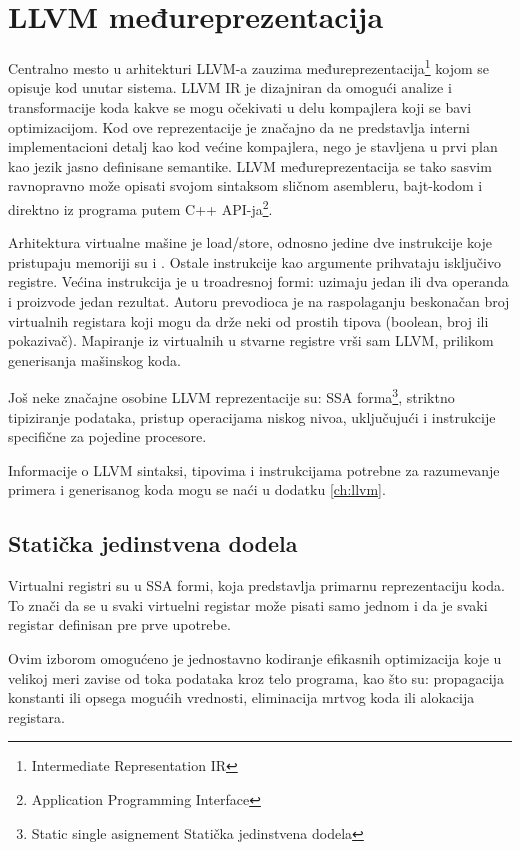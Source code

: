 \section{LLVM međureprezentacija}

Centralno mesto u arhitekturi LLVM-a\cite{aosa} zauzima međureprezentacija\footnote{\eng Intermediate Representation \ndash IR} 
kojom se opisuje kod unutar sistema. 
LLVM IR je dizajniran da omogući analize i transformacije koda kakve se mogu očekivati u delu kompajlera koji se bavi optimizacijom. 
Kod ove reprezentacije je značajno da ne predstavlja interni implementacioni detalj kao kod većine kompajlera, 
nego je stavljena u prvi plan kao jezik jasno definisane semantike. 
LLVM međureprezentacija se tako sasvim ravnopravno može opisati svojom sintaksom sličnom asembleru, 
bajt-kodom i direktno iz programa putem C++ API-ja\footnote{\eng Application Programming Interface}.

Arhitektura virtualne mašine je load/store, odnosno jedine dve instrukcije koje pristupaju memoriji su  i . 
Ostale instrukcije kao argumente prihvataju isključivo registre.
Većina instrukcija je u troadresnoj formi: uzimaju jedan ili dva operanda i proizvode jedan rezultat.
Autoru prevodioca je na raspolaganju beskonačan broj virtualnih registara koji mogu da drže neki od prostih tipova (boolean, broj ili pokazivač). Mapiranje iz virtualnih u stvarne registre vrši sam LLVM, prilikom generisanja mašinskog koda.

Još neke značajne osobine LLVM reprezentacije su: 
SSA forma\footnote{\skr \eng Static single asignement \ndash Statička jedinstvena dodela},
striktno tipiziranje podataka,
pristup operacijama niskog nivoa, uključujući i instrukcije specifične za pojedine procesore.

Informacije o LLVM sintaksi, tipovima i instrukcijama potrebne za razumevanje primera i generisanog koda mogu se naći u dodatku \ref{ch:llvm}.

\subsection*{Statička jedinstvena dodela}

Virtualni registri su u SSA formi, koja predstavlja primarnu reprezentaciju koda.
To znači da se u svaki virtuelni registar može pisati samo jednom i da je svaki registar definisan pre prve upotrebe.

Ovim izborom omogućeno je jednostavno kodiranje efikasnih optimizacija koje u velikoj meri zavise od toka podataka kroz telo programa, kao što su: propagacija konstanti ili opsega mogućih vrednosti, eliminacija mrtvog koda ili alokacija registara.


